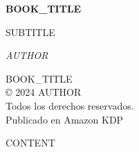\documentclass[12pt,twoside,openany]{book}
\begin{document}
\frontmatter

\begin{titlepage}
    \centering
    \vspace*{2cm}
    {\Huge \textbf{{{BOOK_TITLE}}} \par}
    \vspace{1cm}
    {\Large {{SUBTITLE}} \par}
    \vfill
    {\Large \textit{{{AUTHOR}}} \par}
    \vspace*{3cm}
\end{titlepage}

\newpage
\thispagestyle{empty}
\vspace*{12cm}
\begin{center}
    \small
    {{BOOK_TITLE}} \\
    © 2024 {{AUTHOR}} \\
    Todos los derechos reservados. \\
    Publicado en Amazon KDP \\
\end{center}

\tableofcontents

\mainmatter

{{CONTENT}}
\end{document}
